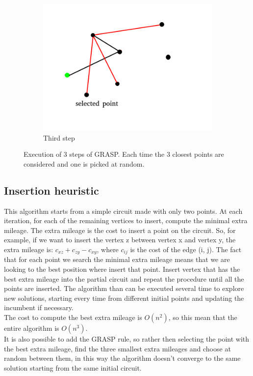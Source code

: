 \begin{figure}[h!]
\begin{subfigure}[b]{0.4\linewidth}
    \includegraphics[width=\linewidth]{media/GRASP3.png}
    \caption{Third step}
  \end{subfigure}
  \caption{Execution of 3 steps of GRASP. Each time the 3 closest points are considered and one is picked at random.}
\end{figure}

\subsection{Insertion heuristic}
This algorithm starts from a simple circuit made with only two points. At each iteration, for each of the remaining vertices to insert, compute the minimal extra mileage. The extra mileage is the cost to insert a point on the circuit. So, for example, if we want to insert the vertex z between vertex x and vertex y, the extra mileage is: $c_{xz} + c_{zy} - c_{xy}$, where $c_{ij}$ is the cost of the edge (i, j). The fact that for each point we search the minimal extra mileage means that we are looking to the best position where insert that point. Insert vertex that has the best extra mileage into the partial circuit and repeat the procedure until all the points are inserted. The algorithm than can be executed several time to explore new solutions, starting every time from different initial points and updating the incumbent if necessary. \\
The cost to compute the best extra mileage is $O(n^2)$, so this mean that the entire algorithm is $O(n^3)$.\\
It is also possible to add the GRASP rule, so rather then selecting the point with the best extra mileage, find the three smallest extra mileages and choose at random between them, in this way the algorithm doesn't converge to the same solution starting from the same initial circuit. \\

